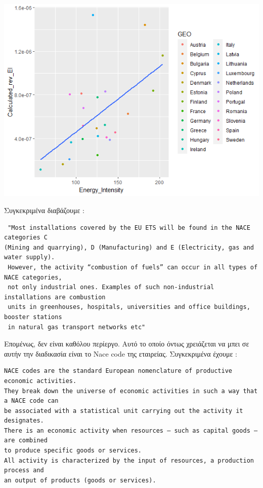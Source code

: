 \documentclass[a4paper,twoside,10pt]{article}
\begin{document}
\begin{center}
	\includegraphics[width=0.7\linewidth]{images/Calculated_EI_EI_Combustion}
\end{center}

Συγκεκριμένα διαβάζουμε \cite{Guidance}: \begin{verbatim} "Most installations covered by the EU ETS will be found in the NACE categories C 
(Mining and quarrying), D (Manufacturing) and E (Electricity, gas and water supply).
 However, the activity “combustion of fuels” can occur in all types of NACE categories,
 not only industrial ones. Examples of such non-industrial installations are combustion
 units in greenhouses, hospitals, universities and office buildings, booster stations
 in natural gas transport networks etc" \end{verbatim} 
Επομένως, δεν είναι καθόλου περίεργο. Αυτό το οποίο όντως χρειάζεται να μπει σε αυτήν την διαδικασία είναι το Nace code της εταιρείας. Συγκεκριμένα έχουμε \cite{Nace1}:
\begin{verbatim}
NACE codes are the standard European nomenclature of productive economic activities.
They break down the universe of economic activities in such a way that a NACE code can
be associated with a statistical unit carrying out the activity it designates.
There is an economic activity when resources – such as capital goods – are combined
to produce specific goods or services.
All activity is characterized by the input of resources, a production process and
an output of products (goods or services).
\end{verbatim}
\end{document}
